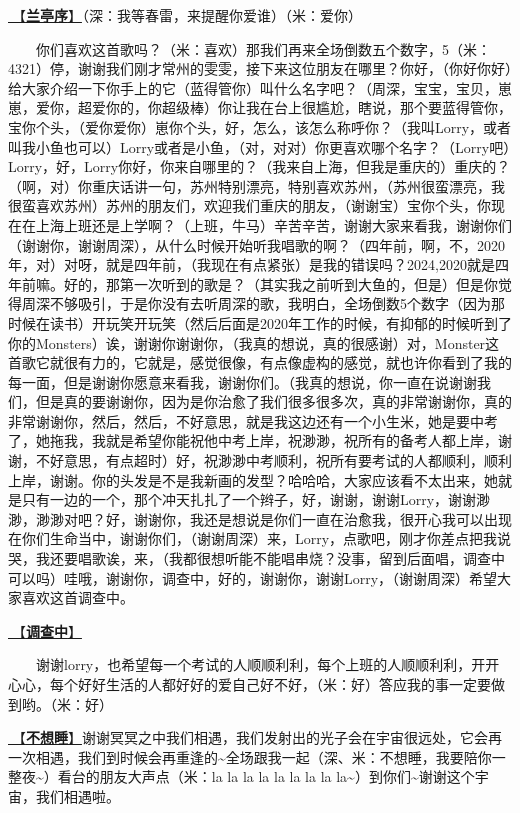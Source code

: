 \documentclass[]{ctexbook}
\begin{document}
\hyperref[lantingxu]{🎵【\textbf{兰亭序}】}（深：我等春雷，来提醒你爱谁）（米：爱你）

  你们喜欢这首歌吗？（米：喜欢）那我们再来全场倒数五个数字，5（米：4321）停，谢谢我们刚才常州的雯雯，接下来这位朋友在哪里？你好，（你好你好）给大家介绍一下你手上的它（蓝得管你）叫什么名字吧？（周深，宝宝，宝贝，崽崽，爱你，超爱你的，你超级棒）你让我在台上很尴尬，瞎说，那个要蓝得管你，宝你个头，（爱你爱你）崽你个头，好，怎么，该怎么称呼你？（我叫Lorry，或者叫我小鱼也可以）Lorry或者是小鱼，（对，对对）你更喜欢哪个名字？（Lorry吧）Lorry，好，Lorry你好，你来自哪里的？（我来自上海，但我是重庆的）重庆的？（啊，对）你重庆话讲一句，苏州特别漂亮，特别喜欢苏州，（苏州很蛮漂亮，我很蛮喜欢苏州）苏州的朋友们，欢迎我们重庆的朋友，（谢谢宝）宝你个头，你现在在上海上班还是上学啊？（上班，牛马）辛苦辛苦，谢谢大家来看我，谢谢你们（谢谢你，谢谢周深），从什么时候开始听我唱歌的啊？（四年前，啊，不，2020年，对）对呀，就是四年前，（我现在有点紧张）是我的错误吗？2024,2020就是四年前嘛。好的，那第一次听到的歌是？（其实我之前听到大鱼的，但是）但是你觉得周深不够吸引，于是你没有去听周深的歌，我明白，全场倒数5个数字（因为那时候在读书）开玩笑开玩笑（然后后面是2020年工作的时候，有抑郁的时候听到了你的Monsters）诶，谢谢你谢谢你，（我真的想说，真的很感谢）对，Monster这首歌它就很有力的，它就是，感觉很像，有点像虚构的感觉，就也许你看到了我的每一面，但是谢谢你愿意来看我，谢谢你们。（我真的想说，你一直在说谢谢我们，但是真的要谢谢你，因为是你治愈了我们很多很多次，真的非常谢谢你，真的非常谢谢你，然后，然后，不好意思，就是我这边还有一个小生米，她是要中考了，她拖我，我就是希望你能祝他中考上岸，祝渺渺，祝所有的备考人都上岸，谢谢，不好意思，有点超时）好，祝渺渺中考顺利，祝所有要考试的人都顺利，顺利上岸，谢谢。你的头发是不是我新画的发型？哈哈哈，大家应该看不太出来，她就是只有一边的一个，那个冲天扎扎了一个辫子，好，谢谢，谢谢Lorry，谢谢渺渺，渺渺对吧？好，谢谢你，我还是想说是你们一直在治愈我，很开心我可以出现在你们生命当中，谢谢你们，（谢谢周深）来，Lorry，点歌吧，刚才你差点把我说哭，我还要唱歌诶，来，（我都很想听能不能唱串烧？没事，留到后面唱，调查中可以吗）哇哦，谢谢你，调查中，好的，谢谢你，谢谢Lorry，（谢谢周深）希望大家喜欢这首调查中。

\hyperref[diaochazhong]{🎵【\textbf{调查中}】}

  谢谢lorry，也希望每一个考试的人顺顺利利，每个上班的人顺顺利利，开开心心，每个好好生活的人都好好的爱自己好不好，（米：好）答应我的事一定要做到哟。（米：好）

\hyperref[donot-want-to-sleep]{🎵【\textbf{不想睡}】}谢谢冥冥之中我们相遇，我们发射出的光子会在宇宙很远处，它会再一次相遇，我们到时候会再重逢的\textasciitilde 全场跟我一起（深、米：不想睡，我要陪你一整夜\textasciitilde）看台的朋友大声点（米：la la la la la la la la la\textasciitilde）到你们\textasciitilde 谢谢这个宇宙，我们相遇啦。
\end{document}
